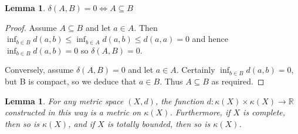 \documentclass[a4paper,11pt]{article}
\newcommand{\bbR}{\mathbb{R}}
\newtheorem{lemma}[thm]{Lemma}
\begin{document}
\begin{lemma}
\label{thm:deltaAndInclusion}
$\delta(A,B)=0\iff A\subseteq B$
\end{lemma}

\begin{proof}
Assume $A\subseteq B$ and let $a\in A$.  Then
$\inf_{b\in B}d(a,b)\leq\inf_{b\in A}d(a,b)\leq d(a,a)=0$ and hence $\inf_{b\in
B}d(a,b)=0$ so $\delta(A,B)=0$.

Conversely, assume $\delta(A,B)=0$ and let $a\in A$.  Certainly
$\inf_{b\in B}d(a,b)=0$, but B is compact, so we deduce that $a\in B$.  Thus
$A\subseteq B$ as required.
\end{proof}

\begin{lemma}
\label{thm:spaceOfCompactSubsets}
For any metric space $(X,d)$, the function $d:\kappa(X)\times\kappa(X)\to\bbR$
constructed in this way is a
metric on $\kappa(X)$.  Furthermore, if $X$ is complete, then so is
$\kappa(X)$, and if $X$ is totally bounded, then so is $\kappa(X)$.
\end{lemma}
\end{document}

